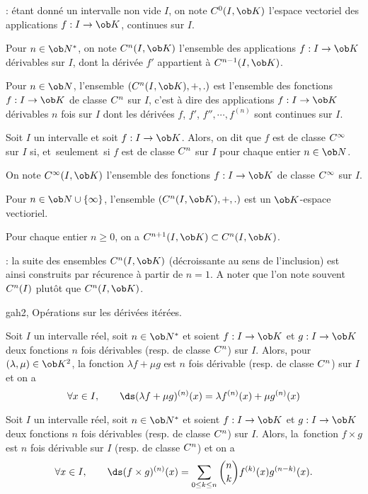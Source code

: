 \Remarque : \'etant donn\'e un intervalle non vide $I$, on note $\sc C^0(I,\ob K)$ l'espace vectoriel 
des applications $f:I\to\ob K$, continues sur $I$. 
\bigskip

\Definition []  Pour $n\in\ob N^*$, on note $\sc C^n(I,\ob K)$ l'ensemble des applications $f:I\to\ob K$ 
d\'erivables sur $I$, dont la d\'eriv\'ee $f'$ appartient \`a $\sc C^{n-1}(I,\ob K)$. 
\bigskip


\Propriete []  Pour $n\in\ob N$, l'ensemble $(\sc C^n(I,\ob K), +, .)$ est l'ensemble des fonctions $f:I\to\ob K$ de classe $\sc C^n$ sur $I$, c'est \`a dire des applications $f:I\to\ob K$ d\'erivables $n$ fois sur $I$ dont les d\'eriv\'ees $f$, $f'$, $f'', \cdots, f^{(n)}$ sont continues sur $I$. 
\bigskip

\Definition []  Soit $I$ un intervalle et soit $f:I\to\ob K$. Alors, on dit que $f$ est de classe $\sc C^\infty$ sur $I$ si, et~seulement~si $f$ est de classe $\sc C^n$ sur $I$ pour chaque entier $n\in\ob N$. 
\bigskip

\Definition []  
On note $\sc C^\infty(I,\ob K)$ l'ensemble des fonctions $f:I\to\ob K$ de classe $\sc C^\infty$ sur $I$. 
\bigskip

\Propriete []  Pour $n\in\ob N\cup\{\infty\}$, l'ensemble $(\sc C^n(I,\ob K), +, .)$ est un $\ob K$-espace vectioriel. 
\bigskip

\Propriete []  Pour chaque entier $n\ge0$, on a $\sc C^{n+1}(I,\ob K)\subset\sc C^n(I,\ob K)$. 
\bigskip

\Remarque : la suite des ensembles $\sc C^n(I,\ob K)$ (d\'ecroissante au sens de l'inclusion) est ainsi construits 
par r\'ecurence \`a partir de $n=1$. A noter que l'on note souvent $\sc C^n(I)$ plut\^ot que $\sc C^n(I,\ob K)$. 
\bigskip

\Subsection gah2, Op\'erations sur les d\'eriv\'ees it\'er\'ees. 



\Theoreme []  Soit $I$ un intervalle r\'eel, soit $n\in\ob N^*$ et soient $f:I\to\ob K$ et $g:I\to\ob K$ 
\pn
deux fonctions $n$ fois d\'erivables (resp. de classe $\sc C^n$) sur $I$. 
Alors, pour $(\lambda,\mu)\in\ob K^2$, la fonction $\lambda f+\mu g$ est $n$ fois d\'erivable 
(resp. de classe $\sc C^n$) sur $I$ et on a 
$$
\forall x\in I, \qquad {\ds(\lambda f+\mu g)^{(n)}(x)=\lambda f^{(n)}(x)+\mu g^{(n)}(x)}
$$

\Theoreme [Title=Formule de Leibniz] Soit $I$ un intervalle r\'eel, soit $n\in\ob N^*$ et soient $f:I\to\ob K$ et $g:I\to\ob K$ 
deux fonctions $n$ fois d\'erivables (resp. de classe $\sc C^n$) sur $I$. Alors, la~fonction $f\times g$ 
est $n$ fois d\'erivable sur $I$ (resp. de classe $\sc C^n$) et on a 
$$
\forall x\in I, \qquad {\ds(f\times g)^{(n)}(x)=\sum_{0\le k\le n}{n\choose k}f^{(k)}(x)g^{(n-k)}(x)}.
$$


